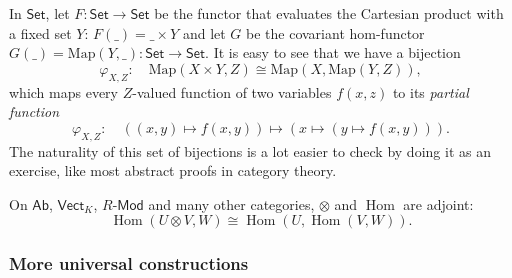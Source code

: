 \documentclass[english,letterpaper]{article}%
\numberwithin{equation}{section}
\numberwithin{figure}{section}
\numberwithin{table}{section}
\theoremstyle{definition}
\theoremstyle{definition}
\theoremstyle{definition}
\theoremstyle{plain}
\theoremstyle{plain}
\theoremstyle{plain}
\theoremstyle{plain}
\theoremstyle{remark}
\theoremstyle{remark}
\DeclareMathOperator{\Hom}{Hom}
\begin{document}
\begin{example}
In $\mathsf{Set}$, let $F:\mathsf{Set}\to\mathsf{Set}$ be the functor
that evaluates the Cartesian product with a fixed set $Y$: $F\left(\_\right)=\_\times Y$
and let $G$ be the covariant hom-functor $G\left(\_\right)=\mathrm{Map}\left(Y,\_\right):\mathsf{Set}\to\mathsf{Set}$.
It is easy to see that we have a bijection
\[
\varphi_{X,Z}:\quad\mathrm{Map}\left(X\times Y,Z\right)\cong\mathrm{Map}\left(X,\mathrm{Map}\left(Y,Z\right)\right),
\]
which maps every $Z$-valued function of two variables $f(x,z)$ to
its \emph{partial function}
\[
\varphi_{X,Z}:\quad\left(\left(x,y\right)\mapsto f(x,y)\right)\mapsto\left(x\mapsto\left(y\mapsto f\left(x,y\right)\right)\right).
\]
The naturality of this set of bijections is a lot easier to check
by doing it as an exercise, like most abstract proofs in category
theory.
\end{example}
%
\begin{example}\label{hom-functor adjoint}
On $\mathsf{Ab}$, $\mathsf{Vect}_{K}$, $R\text{-}\mathsf{Mod}$
and many other categories, $\otimes$ and $\Hom$ are adjoint:
\[
\Hom\left(U\otimes V,W\right)\cong\Hom\left(U,\Hom\left(V,W\right)\right).
\]
\end{example}

\subsubsection{More universal constructions}
\end{document}
